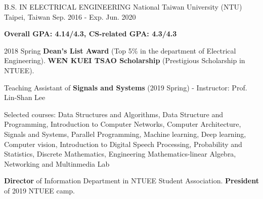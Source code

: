 

\begin{cventries}

  \cventry
    {B.S. IN ELECTRICAL ENGINEERING } %
    {National Taiwan University (NTU) } %
    {Taipei, Taiwan} %
    {Sep. 2016 - Exp. Jun. 2020} %
    {
      \begin{cvitems} %
        \item {\textbf{Overall GPA: 4.14/4.3, CS-related GPA: 4.3/4.3} }
        \item {2018 Spring \textbf{Dean’s List Award} (Top 5\% in the department of Electrical Engineering). \textbf{WEN KUEI TSAO Scholarship} (Prestigious Scholarship in NTUEE).}
        \item {Teaching Assistant of \textbf{Signals and Systems} (2019 Spring) - Instructor: Prof. Lin-Shan Lee}
        \item {Selected courses: Data Structures and Algorithms, Data Structure and Programming, Introduction to Computer Networks, Computer Architecture, Signals and Systems, Parallel Programming, Machine learning, Deep learning, Computer vision, Introduction to Digital Speech Processing, Probability and Statistics, Discrete Mathematics, Engineering Mathematics-linear Algebra, Networking and Multinmedia Lab}
        \item {\textbf{Director} of Information Department in NTUEE Student Association. \textbf{President} of 2019 NTUEE camp.}
      \end{cvitems}
    }

\end{cventries}
